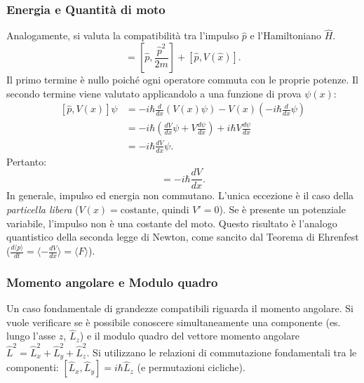 \documentclass[a4paper,11pt]{report}
\begin{document}
\subsubsection{Energia e Quantità di moto}
Analogamente, si valuta la compatibilità tra l'impulso $\hat{p}$ e l'Hamiltoniano $\hat{H}$.
\begin{equation}
    [\hat{p}, \hat{H}] = \left[ \hat{p}, \frac{\hat{p}^2}{2m} \right] + [\hat{p}, V(\hat{x})].
\end{equation}
Il primo termine è nullo poiché ogni operatore commuta con le proprie potenze. Il secondo termine viene valutato applicandolo a una funzione di prova $\psi(x)$:
\begin{equation}
\begin{aligned}
    [\hat{p}, V(x)]\psi &= -i\hbar \frac{d}{dx} (V(x)\psi) - V(x) \left( -i\hbar \frac{d}{dx}\psi \right) \\
    &= -i\hbar \left( \frac{dV}{dx}\psi + V\frac{d\psi}{dx} \right) + i\hbar V \frac{d\psi}{dx} \\
    &= -i\hbar \frac{dV}{dx} \psi.
\end{aligned}
\end{equation}
Pertanto:
\begin{equation}
    [\hat{p}, \hat{H}] = -i\hbar \frac{dV}{dx}.
\end{equation}
In generale, impulso ed energia non commutano. L'unica eccezione è il caso della \textit{particella libera} ($V(x) = \text{costante}$, quindi $V'=0$).
Se è presente un potenziale variabile, l'impulso non è una costante del moto. Questo risultato è l'analogo quantistico della seconda legge di Newton, come sancito dal Teorema di Ehrenfest ($\frac{d\langle p \rangle}{dt} = \langle -\frac{dV}{dx} \rangle = \langle F \rangle$).

\subsubsection{Momento angolare e Modulo quadro}
Un caso fondamentale di grandezze compatibili riguarda il momento angolare. Si vuole verificare se è possibile conoscere simultaneamente una componente (es. lungo l'asse $z$, $\hat{L}_z$) e il modulo quadro del vettore momento angolare $\hat{L}^2 = \hat{L}_x^2 + \hat{L}_y^2 + \hat{L}_z^2$.
Si utilizzano le relazioni di commutazione fondamentali tra le componenti: $[\hat{L}_x, \hat{L}_y] = i\hbar \hat{L}_z$ (e permutazioni cicliche).
\end{document}
